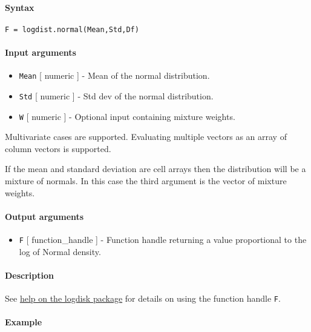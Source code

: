 


	\paragraph{Syntax}\label{syntax}

\begin{verbatim}
F = logdist.normal(Mean,Std,Df)
\end{verbatim}

\paragraph{Input arguments}\label{input-arguments}

\begin{itemize}
\item
  \texttt{Mean} {[} numeric {]} - Mean of the normal distribution.
\item
  \texttt{Std} {[} numeric {]} - Std dev of the normal distribution.
\item
  \texttt{W} {[} numeric {]} - Optional input containing mixture
  weights.
\end{itemize}

Multivariate cases are supported. Evaluating multiple vectors as an
array of column vectors is supported.

If the mean and standard deviation are cell arrays then the distribution
will be a mixture of normals. In this case the third argument is the
vector of mixture weights.

\paragraph{Output arguments}\label{output-arguments}

\begin{itemize}
\itemsep1pt\parskip0pt
\item
  \texttt{F} {[} function\_handle {]} - Function handle returning a
  value proportional to the log of Normal density.
\end{itemize}

\paragraph{Description}\label{description}

See \href{logdist/Contents}{help on the logdisk package} for details on
using the function handle \texttt{F}.

\paragraph{Example}\label{example}


